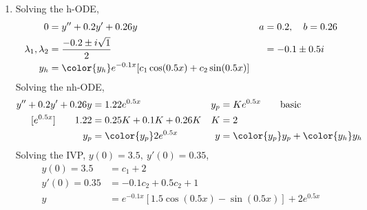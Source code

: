 \begin{enumerate}
    \item Solving the h-ODE,
          \begin{align}
              0                        & = y'' + 0.2y' + 0.26y                   &
              a                        & = 0.2, \quad b = 0.26                     \\
              \lambda_{1}, \lambda_{2} & = \frac{-0.2 \pm i\sqrt{1}}{2}          &
                                       & = -0.1 \pm 0.5i                           \\
              y_{h}                    & = \color{y_h} e^{-0.1x}[c_{1}\cos(0.5x)
                      + c_{2}\sin(0.5x)]
          \end{align}
          Solving the nh-ODE,
          \begin{align}
              y'' + 0.2y' + 0.26y    & = 1.22e^{0.5x}                              &
              y_{p}                  & = Ke^{0.5x} \qquad \text{basic}               \\
              [e^{0.5x}] \qquad 1.22 & = 0.25K + 0.1K + 0.26K                      &
              K                      & = 2                                           \\
              y_{p}                  & = \color{y_p} 2e^{0.5x}                     &
              y                      & = {\color{y_p} y_{p}} + {\color{y_h} y_{h}}
          \end{align}
          Solving the IVP, $ y(0) = 3.5,\ y'(0) = 0.35 $,
          \begin{align}
              y(0) = 3.5   & = c_{1} + 2                                         \\
              y'(0) = 0.35 & = -0.1c_{2} + 0.5c_{2} + 1                          \\
              y            & = e^{-0.1x}[1.5\cos(0.5x) - \sin(0.5x)] + 2e^{0.5x}
          \end{align}


\end{enumerate}
